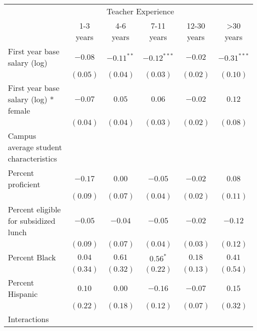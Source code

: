 \documentclass[]{article}
\begin{document}
\begin{table}
\begin{center}
\begin{tabular}{l c c c c c }
\hline
 & \multicolumn{4}{c}{Teacher Experience} \\ \cline{2-6}
 & 1-3 years & 4-6 years & 7-11 years & 12-30 years & >30 years \\
\hline
First year base salary (log)                & $-0.08$      & $-0.11^{**}$ & $-0.12^{***}$ & $-0.02$      & $-0.31^{***}$ \\
                                            & $(0.05)$     & $(0.04)$     & $(0.03)$      & $(0.02)$     & $(0.10)$      \\
First year base salary (log) * female       & $-0.07$      & $0.05$       & $0.06$        & $-0.02$      & $0.12$        \\
                                            & $(0.04)$     & $(0.04)$     & $(0.03)$      & $(0.02)$     & $(0.08)$      \\
Campus average student characteristics      &              &              &               &              &               \\
\quad Percent proficient                    & $-0.17$      & $0.00$       & $-0.05$       & $-0.02$      & $0.08$        \\
                                            & $(0.09)$     & $(0.07)$     & $(0.04)$      & $(0.02)$     & $(0.11)$      \\
\quad Percent eligible for subsidized lunch & $-0.05$      & $-0.04$      & $-0.05$       & $-0.02$      & $-0.12$       \\
                                            & $(0.09)$     & $(0.07)$     & $(0.04)$      & $(0.03)$     & $(0.12)$      \\
\quad Percent Black                         & $0.04$       & $0.61$       & $0.56^{*}$    & $0.18$       & $0.41$        \\
                                            & $(0.34)$     & $(0.32)$     & $(0.22)$      & $(0.13)$     & $(0.54)$      \\
\quad Percent Hispanic                      & $0.10$       & $0.00$       & $-0.16$       & $-0.07$      & $0.15$        \\
                                            & $(0.22)$     & $(0.18)$     & $(0.12)$      & $(0.07)$     & $(0.32)$      \\
Interactions                                &              &              &               &              &               \\

\end{tabular}
\end{center}
\end{table}
\end{document}
